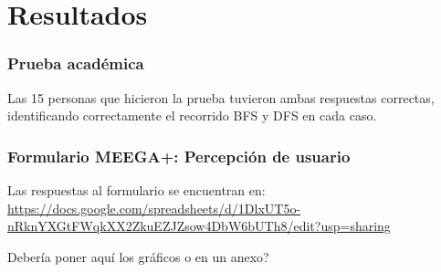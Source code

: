 \chapter{Resultados}

\subsection{Prueba académica}

Las 15 personas que hicieron la prueba tuvieron ambas respuestas correctas, identificando correctamente el recorrido BFS y DFS en cada caso.


\subsection{Formulario MEEGA+: Percepción de usuario}

Las respuestas al formulario se encuentran en: \href{https://docs.google.com/spreadsheets/d/1DlxUT5o-nRknYXGtFWqkXX2ZkuEZJZsow4DbW6bUTh8/edit?usp=sharing}{https://docs.google.com/spreadsheets/d/1DlxUT5o-nRknYXGtFWqkXX2ZkuEZJZsow4DbW6bUTh8/edit?usp=sharing}


Debería poner aquí los gráficos o en un anexo?

